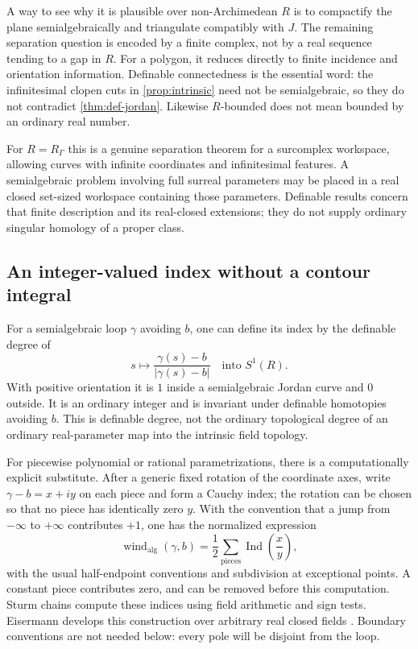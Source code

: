 \documentclass[11pt,letterpaper]{article}
\theoremstyle{definition}
\theoremstyle{remark}
\newcommand{\wind}{\operatorname{wind}}\newcommand{\Ind}{\operatorname{Ind}}\newcommand{\id}{\operatorname{id}}
\numberwithin{equation}{section}
\begin{document}
A way to see why it is plausible over non-Archimedean $R$ is to compactify the plane semialgebraically and triangulate compatibly with $J$. The remaining separation question is encoded by a finite complex, not by a real sequence tending to a gap in $R$. For a polygon, it reduces directly to finite incidence and orientation information. Definable connectedness is the essential word: the infinitesimal clopen cuts in \cref{prop:intrinsic} need not be semialgebraic, so they do not contradict \cref{thm:def-jordan}. Likewise $R$-bounded does not mean bounded by an ordinary real number.

For $R=R_\Gamma$ this is a genuine separation theorem for a surcomplex workspace, allowing curves with infinite coordinates and infinitesimal features. A semialgebraic problem involving full surreal parameters may be placed in a real closed set-sized workspace containing those parameters. Definable results concern that finite description and its real-closed extensions; they do not supply ordinary singular homology of a proper class.

\subsection{An integer-valued index without a contour integral}
For a semialgebraic loop $\gamma$ avoiding $b$, one can define its index by the definable degree of
\[
 s\longmapsto\frac{\gamma(s)-b}{|\gamma(s)-b|}\quad\text{into }S^1(R).
\]
With positive orientation it is $1$ inside a semialgebraic Jordan curve and $0$ outside. It is an ordinary integer and is invariant under definable homotopies avoiding $b$. This is definable degree, not the ordinary topological degree of an ordinary real-parameter map into the intrinsic field topology.

For piecewise polynomial or rational parametrizations, there is a computationally explicit substitute. After a generic fixed rotation of the coordinate axes, write $\gamma-b=x+iy$ on each piece and form a Cauchy index; the rotation can be chosen so that no piece has identically zero $y$. With the convention that a jump from $-\infty$ to $+\infty$ contributes $+1$, one has the normalized expression
\begin{equation}\label{eq:cauchyindex}
 \wind_{\mathrm{alg}}(\gamma,b)
   =\frac12\sum_{\text{pieces}}\Ind\left(\frac{x}{y}\right),
\end{equation}
with the usual half-endpoint conventions and subdivision at exceptional points. A constant piece contributes zero, and can be removed before this computation. Sturm chains compute these indices using field arithmetic and sign tests. Eisermann develops this construction over arbitrary real closed fields \cite{Eisermann}. Boundary conventions are not needed below: every pole will be disjoint from the loop.
\end{document}
